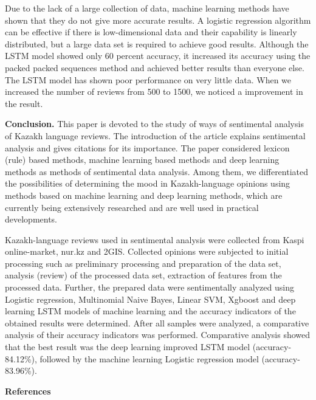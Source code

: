 \begin{multicols}{2}
Due to the lack of a large collection of data, machine learning methods
have shown that they do not give more accurate results. A logistic
regression algorithm can be effective if there is low-dimensional data
and their capability is linearly distributed, but a large data set is
required to achieve good results. Although the LSTM model showed only 60
percent accuracy, it increased its accuracy using the packed packed
sequences method and achieved better results than everyone else. The
LSTM model has shown poor performance on very little data. When we
increased the number of reviews from 500 to 1500, we noticed a
improvement in the result.

{\bfseries Conclusion.} This paper is devoted to the study of ways of
sentimental analysis of Kazakh language reviews. The introduction of the
article explains sentimental analysis and gives citations for its
importance. The paper considered lexicon (rule) based methods, machine
learning based methods and deep learning methods as methods of
sentimental data analysis. Among them, we differentiated the
possibilities of determining the mood in Kazakh-language opinions using
methods based on machine learning and deep learning methods, which are
currently being extensively researched and are well used in practical
developments.

Kazakh-language reviews used in sentimental analysis were collected from
Kaspi online-market, nur.kz and 2GIS. Collected opinions were subjected
to initial processing such as preliminary processing and preparation of
the data set, analysis (review) of the processed data set, extraction of
features from the processed data. Further, the prepared data were
sentimentally analyzed using Logistic regression, Multinomial Naive
Bayes, Linear SVM, Xgboost and deep learning LSTM models of machine
learning and the accuracy indicators of the obtained results were
determined. After all samples were analyzed, a comparative analysis of
their accuracy indicators was performed. Comparative analysis showed
that the best result was the deep learning improved LSTM model
(accuracy-84.12\%), followed by the machine learning Logistic regression
model (accuracy-83.96\%).
\end{multicols}

\begin{center}
{\bfseries References}
\end{center}

